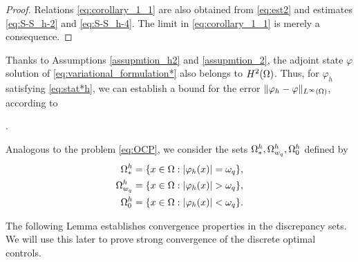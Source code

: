 \begin{proof}
Relations \eqref{eq:corollary_1_1} are also obtained from \eqref{eq:est2} and estimates \eqref{eq:S-S_h-2} and \eqref{eq:S-S_h-4}. %
The limit in \eqref{eq:corollary_1_1} is merely a consequence. 
\end{proof}

Thanks to  Assumptions \ref{assupmtion_h2} and \ref{assupmtion_2}, the adjoint state $\varphi$ solution of \eqref{eq:variational_formulation*} also belongs to $H^2(\Omega)$. Thus, for $\varphi_h$ satisfying \eqref{eq:stat*h}, we can establish a bound for the error $\lVert \varphi_h-\varphi \rVert_{L^\infty(\Omega)}$, according to {\cite[Theorem 19.3]{ciarlet1990}. 

Analogous to the problem \eqref{eq:OCP}, we consider the sets $\Omega^h_*,\Omega_{w_q}^{h}, \Omega_{0}^h$ defined  by 
\begin{subequations}\label{eq:om_parts_h}
	\begin{align}
	\Omega_{*}^h=\{x\in\Omega: | \varphi_h(x)| = \omega_q \},\\
	\Omega_{w_q}^{h}=\{x\in\Omega: | \varphi_h(x)| > \omega_q \}, \label{eq:Omega_jump_h}\\
	\Omega_{0}^{h}=\{x\in\Omega: | \varphi_h(x)| < \omega_q \}.
\end{align}
\end{subequations}

The following Lemma establishes convergence properties in the discrepancy sets. We will use this later to prove strong convergence of the discrete optimal controls.

}
